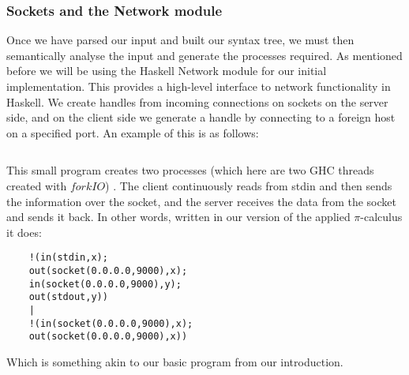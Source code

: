 \subsubsection{Sockets and the Network module}

Once we have parsed our input and built our syntax tree, we must then semantically analyse the input and generate the processes required. As mentioned before we will be using the Haskell Network module  for our initial implementation. This provides a high-level interface to network functionality in Haskell. We create handles from incoming connections on sockets on the server side, and on the client side we generate a handle by connecting to a foreign host on a specified port. An example
of this is as follows: 

\inputminted[linenos,frame=lines]{hs}{sockets.hs}

This small program creates two processes (which here are two GHC threads created with $forkIO$) . The client continuously reads from stdin and then sends the information over the socket, and the server receives the data from the socket and sends it back. In other words, written in our version of the applied $\pi$-calculus it does:
\begin{verbatim}
    !(in(stdin,x);
    out(socket(0.0.0.0,9000),x);
    in(socket(0.0.0.0,9000),y);
    out(stdout,y)) 
    |
    !(in(socket(0.0.0.0,9000),x);
    out(socket(0.0.0.0,9000),x))
\end{verbatim}

Which is something akin to our basic program from our introduction.

